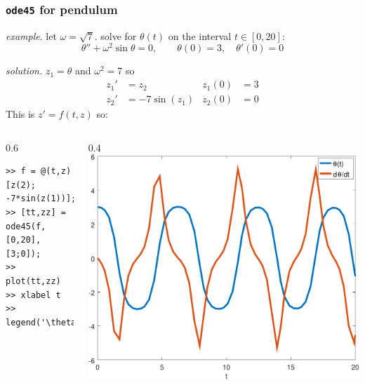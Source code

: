 \documentclass[dvipsnames,colorlinks]{beamer}
\begin{document}
\begin{frame}[fragile]
\frametitle{\texttt{ode45} for pendulum}

\noindent \emph{example}.  let $\omega=\sqrt{7}$.  solve for $\theta(t)$ on the interval $t\in [0,20]$:
    $$\theta''+ \omega^2 \sin\theta = 0, \qquad \theta(0)=3, \quad \theta'(0)=0$$

\noindent \emph{solution.}  $z_1=\theta$ and $\omega^2=7$ so
\begin{align*}
z_1' &= z_2 & z_1(0)&=3 \\
z_2' &= - 7 \sin(z_1) & z_2(0)&=0
\end{align*}
This is $z'=f(t,z)$ so:

\begin{columns}
\begin{column}{0.6\textwidth}
\begin{Verbatim}[fontsize=\small]
>> f = @(t,z) [z(2); -7*sin(z(1))];
>> [tt,zz] = ode45(f,[0,20],[3;0]);
>> plot(tt,zz)
>> xlabel t
>> legend('\theta(t)','d\theta/dt')
\end{Verbatim}

\vspace{10mm}
\end{column}
\begin{column}{0.4\textwidth}
\includegraphics[width=\textwidth]{figs/pend-chunky}
\end{column}
\end{columns}
\end{frame}
\end{document}
